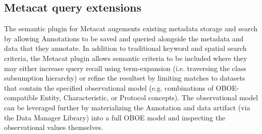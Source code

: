 \subsection{Metacat query extensions}
The semantic plugin for Metacat augements existing metadata storage and search by allowing Annotations to be saved and queried alongside the metadata and data that they annotate. In addition to traditional keyword and spatial search criteria, the Metacat plugin allows semantic criteria to be included where they may either increase query recall using term-expansion (i.e. traversing the class subsumption hierarchy) or refine the resultset by limiting matches to datasets that contain the specified observational model (e.g. combinations of OBOE-compatible Entity, Characteristic, or Protocol concepts). The observational model can be leveraged further by materializing the Annotation and data artifact (via the Data Manager Library) into a full OBOE model and inspecting the observational values themselves. 

